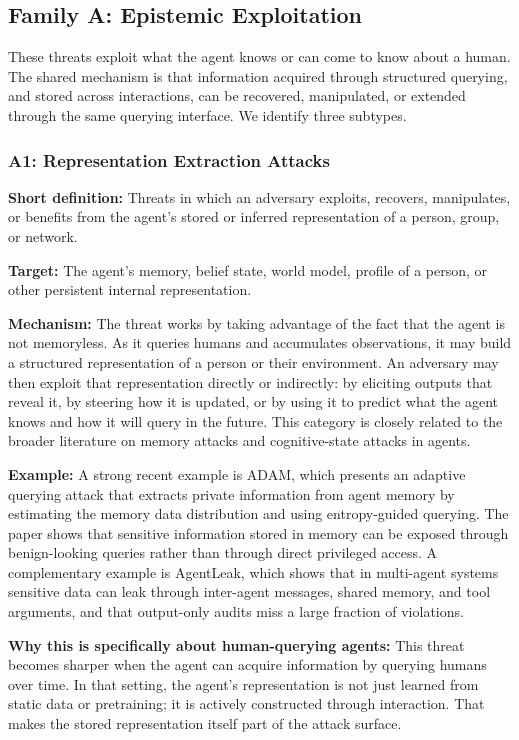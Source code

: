 \documentclass[11pt]{article}
\begin{document}
\subsection{Family A: Epistemic Exploitation}

These threats exploit what the agent knows or can come to know about a human. The shared mechanism is that information acquired through structured querying, and stored across interactions, can be recovered, manipulated, or extended through the same querying interface. We identify three subtypes.

\subsubsection{A1: Representation Extraction Attacks}

\textbf{Short definition:} Threats in which an adversary exploits, recovers, manipulates, or benefits from the agent's stored or inferred representation of a person, group, or network.

\textbf{Target:} The agent's memory, belief state, world model, profile of a person, or other persistent internal representation.

\textbf{Mechanism:} The threat works by taking advantage of the fact that the agent is not memoryless. As it queries humans and accumulates observations, it may build a structured representation of a person or their environment. An adversary may then exploit that representation directly or indirectly: by eliciting outputs that reveal it, by steering how it is updated, or by using it to predict what the agent knows and how it will query in the future. This category is closely related to the broader literature on memory attacks and cognitive-state attacks in agents. \citep{oliver2026humanapi,franklin2026agenttraps}

\textbf{Example:} A strong recent example is ADAM, which presents an adaptive querying attack that extracts private information from agent memory by estimating the memory data distribution and using entropy-guided querying. The paper shows that sensitive information stored in memory can be exposed through benign-looking queries rather than through direct privileged access. A complementary example is AgentLeak, which shows that in multi-agent systems sensitive data can leak through inter-agent messages, shared memory, and tool arguments, and that output-only audits miss a large fraction of violations. \citep{adam2026memoryattack,agentleak2026}

\textbf{Why this is specifically about human-querying agents:} This threat becomes sharper when the agent can acquire information by querying humans over time. In that setting, the agent's representation is not just learned from static data or pretraining; it is actively constructed through interaction. That makes the stored representation itself part of the attack surface.
\end{document}
